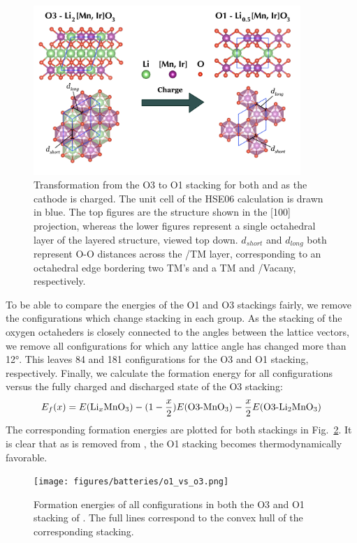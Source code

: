 \begin{refsection}
\begin{figure}[h]
\centering
\includegraphics[width=0.9\textwidth]{figures/batteries/structural_change.png}
\caption{Transformation from the O3 to O1 stacking for both  and  as the cathode is charged. The unit cell of the HSE06 calculation is drawn in blue. The top figures are the structure shown in the [100] projection, whereas the lower figures represent a single octahedral layer of the layered structure, viewed top down.  $d_{short}$ and $d_{long}$ both represent O-O distances across the /TM layer, corresponding to an octahedral edge bordering two TM's and a TM and /Vacany, respectively.}
\label{batteries:fig-structural_change}
\end{figure}

To be able to compare the energies of the O1 and O3 stackings fairly, we remove the configurations which change stacking in each group. As the stacking of the oxygen octaheders is closely connected to the angles between the lattice vectors, we remove all configurations for which any lattice angle has changed more than 12\si{\degree}. This leaves 84 and 181 configurations for the O3 and O1 stacking, respectively. Finally, we calculate the formation energy for all configurations versus the fully charged and discharged state of the O3 stacking:
\begin{equation}
E_f (x) = E(\ce{Li_xMnO3}) - (1 - \frac{x}{2}) E(\text{O3-}\ce{MnO3}) - \frac{x}{2} E(\text{O3-}\ce{Li2MnO3})
\end{equation}
The corresponding formation energies are plotted for both stackings in Fig.~\ref{batteries:fig-li_configuration}. It is clear that as  is removed from , the O1 stacking becomes thermodynamically favorable.

\begin{figure}[h]
\centering
\texttt{[image: figures/batteries/o1\_vs\_o3.png]}
\caption{Formation energies of all configurations in both the O3 and O1 stacking of . The full lines correspond to the convex hull of the corresponding stacking.}
\label{batteries:fig-li_configuration}
\end{figure}


\end{refsection}
